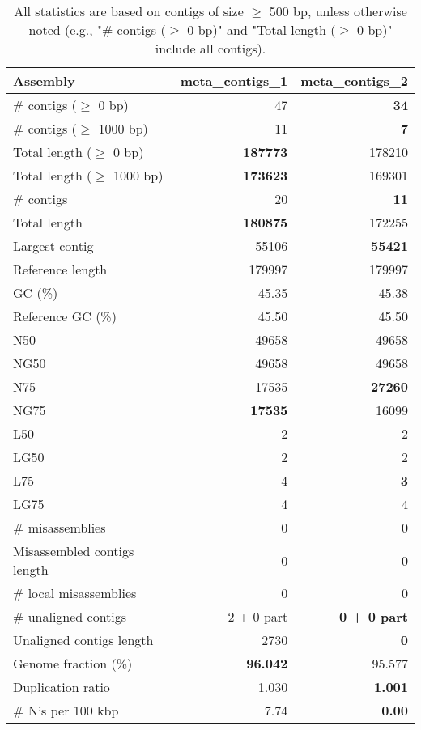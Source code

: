 \documentclass[12pt,a4paper]{article}
\begin{document}
\begin{table}[ht]
\begin{center}
\caption{All statistics are based on contigs of size $\geq$ 500 bp, unless otherwise noted (e.g., "\# contigs ($\geq$ 0 bp)" and "Total length ($\geq$ 0 bp)" include all contigs).}
\begin{tabular}{|l*{2}{|r}|}
\hline
Assembly & meta\_contigs\_1 & meta\_contigs\_2 \\ \hline
\# contigs ($\geq$ 0 bp) & 47 & {\bf 34} \\ \hline
\# contigs ($\geq$ 1000 bp) & 11 & {\bf 7} \\ \hline
Total length ($\geq$ 0 bp) & {\bf 187773} & 178210 \\ \hline
Total length ($\geq$ 1000 bp) & {\bf 173623} & 169301 \\ \hline
\# contigs & 20 & {\bf 11} \\ \hline
Total length & {\bf 180875} & 172255 \\ \hline
Largest contig & 55106 & {\bf 55421} \\ \hline
Reference length & 179997 & 179997 \\ \hline
GC (\%) & 45.35 & 45.38 \\ \hline
Reference GC (\%) & 45.50 & 45.50 \\ \hline
N50 & 49658 & 49658 \\ \hline
NG50 & 49658 & 49658 \\ \hline
N75 & 17535 & {\bf 27260} \\ \hline
NG75 & {\bf 17535} & 16099 \\ \hline
L50 & 2 & 2 \\ \hline
LG50 & 2 & 2 \\ \hline
L75 & 4 & {\bf 3} \\ \hline
LG75 & 4 & 4 \\ \hline
\# misassemblies & 0 & 0 \\ \hline
Misassembled contigs length & 0 & 0 \\ \hline
\# local misassemblies & 0 & 0 \\ \hline
\# unaligned contigs & 2 + 0 part & {\bf 0 + 0 part} \\ \hline
Unaligned contigs length & 2730 & {\bf 0} \\ \hline
Genome fraction (\%) & {\bf 96.042} & 95.577 \\ \hline
Duplication ratio & 1.030 & {\bf 1.001} \\ \hline
\# N's per 100 kbp & 7.74 & {\bf 0.00} \\ \hline

\end{tabular}
\end{center}
\end{table}
\end{document}

